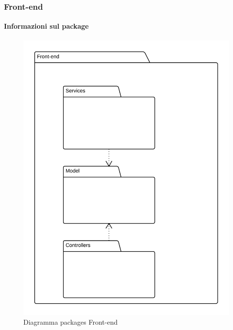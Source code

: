 
  \subsubsection{Front-end}
  \paragraph{Informazioni sul package}
    \begin{figure}[H] 
      \begin{center}
        \includegraphics[width=\textwidth]{uml/package/Front-end.png}
        \caption{Diagramma packages Front-end}
      \end{center}  
    \end{figure} 
    

